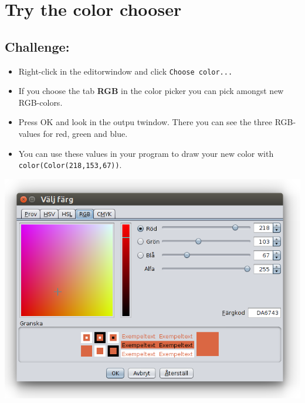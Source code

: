 \chapter{Try the color chooser}
\begin{multicols}{2}
\section*{\color{BrickRed}Challenge:}


\begin{itemize}

\item {Right-click in the editorwindow and click \lstinline{Choose color...}}
\item {If you choose the tab {\bf RGB} in the color picker you can pick amongst new RGB-colors.}
\item {Press OK and look in the outpu twindow. There you can see the three RGB-values for red, green and blue.}
\item {You can use these values in your program to draw your new color with \lstinline{color(Color(218,153,67))}.}

\end{itemize}



\columnbreak

\begin{center}
\includegraphics[width=14.0cm]{../img/color-chooser-rgb-sv.png}
\end{center}

\end{multicols}

